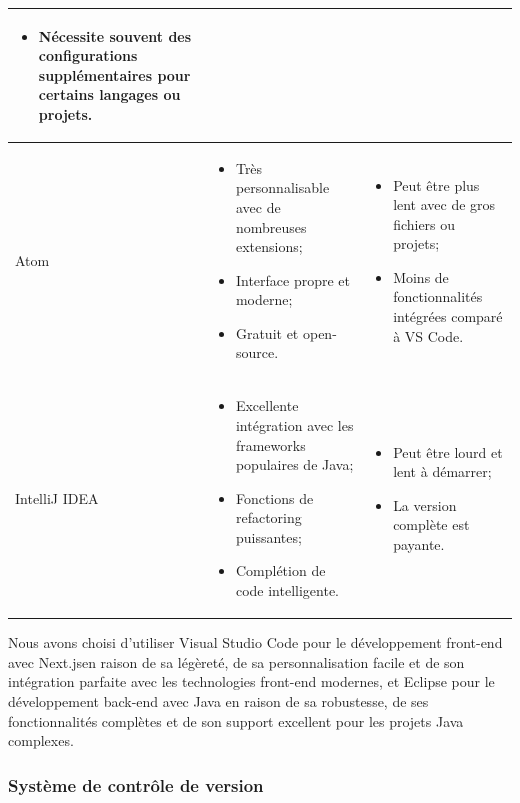 \documentclass[12pt]{report}
\begin{document}
\begin{longtable}{|p{3cm}|p{5.5cm}|p{5.5cm}|}
\begin{itemize}
							\item Nécessite souvent des configurations supplémentaires pour certains langages ou projets.
						\end{itemize}\\
						 \hline
						Atom & 
						\begin{itemize}
							\item Très personnalisable avec de nombreuses extensions;
							\item Interface propre et moderne;
							\item Gratuit et open-source.
						\end{itemize}
						&
						\begin{itemize}
							\item Peut être plus lent avec de gros fichiers ou projets;
							\item Moins de fonctionnalités intégrées comparé à VS Code.
						\end{itemize}\\
						 \hline
						IntelliJ IDEA & 
						\begin{itemize}
							\item Excellente intégration avec les frameworks populaires de Java;
							\item Fonctions de refactoring puissantes;
							\item Complétion de code intelligente.
						\end{itemize}
						&
						\begin{itemize}
							\item Peut être lourd et lent à démarrer;
							\item La version complète est payante.
						\end{itemize}\\
						\hline

				    \end{longtable}


				Nous avons choisi d'utiliser Visual Studio Code pour le développement front-end avec Next.jsen raison de sa légèreté, de sa personnalisation facile et de son intégration parfaite avec les technologies front-end modernes, et Eclipse pour le développement back-end avec Java en raison de sa robustesse, de ses fonctionnalités complètes et de son support excellent pour les projets Java complexes.


				\subsubsection{Système de contrôle de version}
\end{document}
